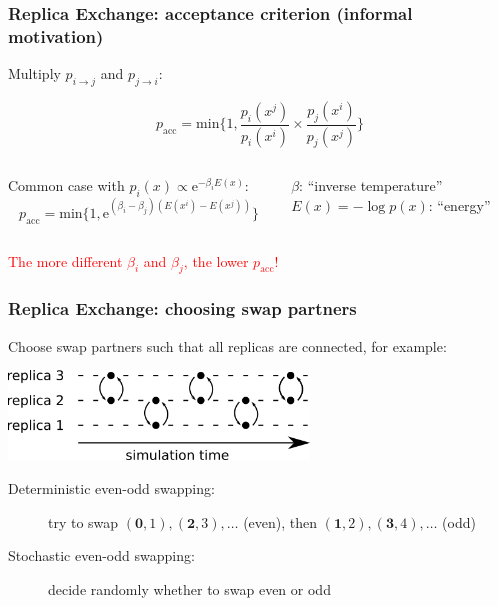 \documentclass[t,aspectratio=169]{beamer}
\begin{document}
\begin{frame}[fragile]
  \frametitle{Replica Exchange: acceptance criterion (informal motivation)}
  Multiply $p_{i\rightarrow j}$ and $p_{j\rightarrow i}$:
  \begin{tcolorbox}[title=General acceptance criterion]
    \begin{equation*}
      p_{\mathrm{acc}}= \mathrm{min}\Bigg\{1, \frac{p_i(x^j)}{p_i(x^i)} \times \frac{p_j(x^i)}{p_j(x^j)}\Bigg\}
    \end{equation*}
  \end{tcolorbox}
  \begin{columns}
    \begin{column}[T]{0.5\textwidth}
      Common case with $p_i(x)\propto \mathrm{e}^{-\beta_i E(x)}$:
      \begin{equation*}
        p_{\mathrm{acc}} = \mathrm{min}\bigg\{1, \mathrm{e}^{(\beta_i-\beta_j)(E(x^i)-E(x^j))}\bigg\}
      \end{equation*}
    \end{column}
    \begin{column}[T]{0.43\textwidth}
      \begin{tcolorbox}[title=Physics terms]
        $\beta$: ``inverse temperature''\\
        $E(x)=-\log p(x)$: ``energy''
      \end{tcolorbox}
    \end{column}
  \end{columns}
  \bigskip
  \textcolor{red}{The more different $\beta_i$ and $\beta_j$, the lower $p_{\mathrm{acc}}$!}
\end{frame}

\begin{frame}
  \frametitle{Replica Exchange: choosing swap partners}
  Choose swap partners such that all replicas are connected, for example:
  \begin{center}
    \includegraphics[width=0.6\textwidth]{images/good_swap_strategy}
  \end{center}
  \begin{description}
  \item[Deterministic even-odd swapping:] try to swap $(\mathbf 0, 1), (\mathbf 2, 3), \ldots$ (even), then $(\mathbf 1,2), (\mathbf 3,4), \ldots$ (odd)
  \item[Stochastic even-odd swapping:] decide randomly whether to swap even or odd
  \end{description}
\end{frame}
\end{document}
